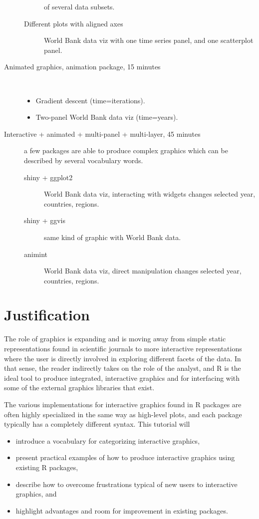 \documentclass[11pt]{article}
\begin{document}
\begin{description}
\begin{description}
of several data subsets.
\item[{Different plots with aligned axes}] World Bank data viz with one
time series panel, and one scatterplot panel.
\end{description}
\item[{Animated graphics, animation package, 15 minutes}] \mbox{ }
\begin{itemize}
\item Gradient descent (time=iterations).
\item Two-panel World Bank data viz (time=years).
\end{itemize}
\item[{Interactive + animated + multi-panel + multi-layer, 45 minutes}] a
few packages are able to produce complex graphics which can be
described by several vocabulary words.
\begin{description}
\item[{shiny + ggplot2}] World Bank data viz, interacting with widgets
changes selected year, countries, regions.
\item[{shiny + ggvis}] same kind of graphic with World Bank data.
\item[{animint}] World Bank data viz, direct manipulation changes
selected year, countries, regions.
\end{description}
\end{description}

\section{Justification}
\label{sec:orgheadline11}

The role of graphics is expanding and is moving away from simple
static representations found in scientific journals to more
interactive representations where the user is directly involved in
exploring different facets of the data. In that sense, the reader
indirectly takes on the role of the analyst, and R is the ideal tool
to produce integrated, interactive graphics and for interfacing with
some of the external graphics libraries that exist.

The various implementations for interactive graphics found in R
packages are often highly specialized in the same way as high-level
plots, and each package typically has a completely different
syntax. This tutorial will 
\begin{itemize}
\item introduce a vocabulary for categorizing interactive graphics,
\item present practical examples of how to produce interactive graphics
using existing R packages,
\item describe how to overcome frustrations typical of new users to
interactive graphics, and
\item highlight advantages and room for improvement in existing
packages.
\end{itemize}
\end{document}
